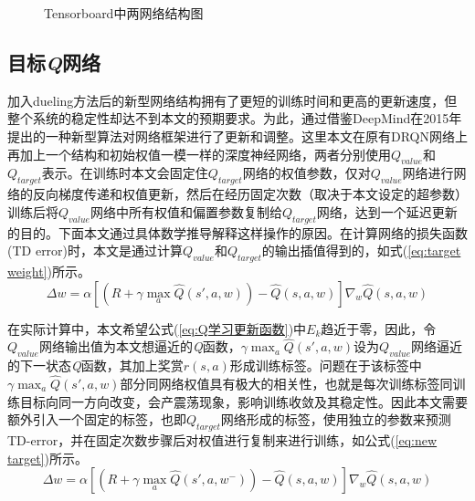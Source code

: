 \begin{figure}[htbp]
	\begin{minipage}{\textwidth}
		\centering
		\subfigure{\label{fig:tensorboard_q_net}}\addtocounter{subfigure}{-2}
		\hspace{1em}
		\subfigure{\label{fig:tensorboard_q_target}}\addtocounter{subfigure}{-2}
		\hspace{1em}	
	\end{minipage}
	\vspace{0.2em}
	\caption{Tensorboard中两网络结构图}\label{fig:target网络}
\end{figure}

\subsection{目标\textit{Q}网络}
加入dueling方法后的新型网络结构拥有了更短的训练时间和更高的更新速度，但整个系统的稳定性却达不到本文的预期要求。为此，通过借鉴DeepMind在2015年提出的一种新型算法对网络框架进行了更新和调整。这里本文在原有DRQN网络上再加上一个结构和初始权值一模一样的深度神经网络，两者分别使用$Q_{value}$和$Q_{target}$表示。在训练时本文会固定住$Q_{target}$网络的权值参数，仅对$Q_{value}$网络进行网络的反向梯度传递和权值更新，然后在经历固定次数（取决于本文设定的超参数）训练后将$Q_{value}$网络中所有权值和偏置参数复制给$Q_{target}$网络，达到一个延迟更新的目的。下面本文通过具体数学推导解释这样操作的原因。在计算网络的损失函数(TD error)时，本文是通过计算$Q_{value}$和$Q_{target}$的输出插值得到的，如式(\ref{eq:target weight})所示。
\begin{equation}\label{eq:target weight}
\Delta w=\alpha\left [ \left ( R+\gamma\max _{a} \hat{Q}\left ( {s}' ,a,w\right )\right )- \hat{Q}\left ( s ,a,w\right )\right ]\nabla_{w}\hat{Q}\left ( s,a,w \right )
\end{equation}


在实际计算中，本文希望公式(\ref{eq:Q学习更新函数})中$E_{k}$趋近于零，因此，令$Q_{value}$网络输出值为本文想逼近的\textit{Q}函数，$\gamma\max _{a} \hat{Q}\left ( {s}' ,a,w\right )$设为$Q_{value}$网络逼近的下一状态\textit{Q}函数，其加上奖赏$r(s,a)$形成训练标签。问题在于该标签中$\gamma\max_{a}\hat{Q}\left ( {s}' ,a,w \right )$部分同网络权值具有极大的相关性，也就是每次训练标签同训练目标向同一方向改变，会产震荡现象，影响训练收敛及其稳定性。因此本文需要额外引入一个固定的标签，也即$Q_{target}$网络形成的标签，使用独立的参数来预测TD-error，并在固定次数步骤后对权值进行复制来进行训练，如公式(\ref{eq:new target})所示。
\begin{equation}\label{eq:new target}
\Delta w=\alpha\left [ \left ( R+\gamma\max _{a} \hat{Q}\left ( {s}' ,a,w^{-}\right )\right )- 	\hat{Q}\left ( s ,a,w\right )\right ]\nabla_{w}\hat{Q}\left ( s,a,w \right )
\end{equation}

